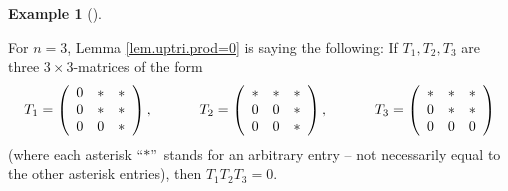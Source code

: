 \documentclass[numbers=enddot,12pt,final,onecolumn,notitlepage]{scrartcl}%
\numberwithin{exer}{subsection}
\theoremstyle{definition}
\newtheorem{exam}[theo]{Example}
\newenvironment{example}[1][]
{\begin{exam}[#1]\begin{leftbar}}
{\end{leftbar}\end{exam}}
\begin{document}
\begin{example}
For $n=3$, Lemma \ref{lem.uptri.prod=0} is saying the following: If
$T_{1},T_{2},T_{3}$ are three $3\times3$-matrices of the form%
\[
T_{1}=\left(
\begin{array}
[c]{ccc}%
0 & \ast & \ast\\
0 & \ast & \ast\\
0 & 0 & \ast
\end{array}
\right)  ,\ \ \ \ \ \ \ \ \ \ T_{2}=\left(
\begin{array}
[c]{ccc}%
\ast & \ast & \ast\\
0 & 0 & \ast\\
0 & 0 & \ast
\end{array}
\right)  ,\ \ \ \ \ \ \ \ \ \ T_{3}=\left(
\begin{array}
[c]{ccc}%
\ast & \ast & \ast\\
0 & \ast & \ast\\
0 & 0 & 0
\end{array}
\right)
\]
(where each asterisk \textquotedblleft$\ast$\textquotedblright\ stands for an
arbitrary entry -- not necessarily equal to the other asterisk entries), then
$T_{1}T_{2}T_{3}=0$.
\end{example}
\end{document}
